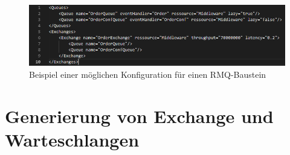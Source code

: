 \begin{figure}
\center
  \includegraphics[width=1\textwidth]{code/configExample.png}
  \caption{Beispiel einer möglichen Konfiguration für einen RMQ-Baustein}
  \label{img:configExample}
\end{figure}

\section{Generierung von Exchange und Warteschlangen}
